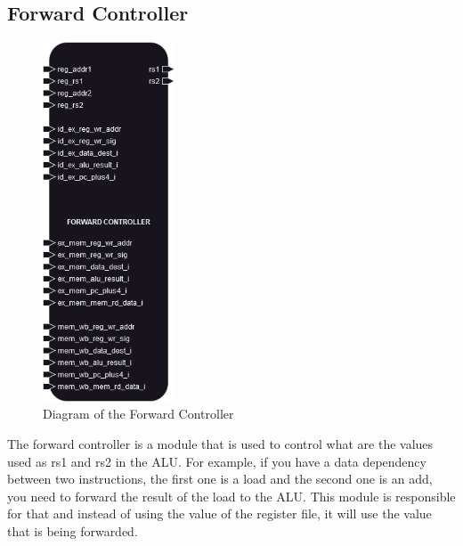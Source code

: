 \subsection{Forward Controller}

\begin{figure}[H]
\centering
\includegraphics[width=0.35\textwidth]{../diagrams/decode/forward_controller.png}
\caption{Diagram of the Forward Controller}
\label{fig:forward_controller}
\end{figure}

The forward controller is a module that is used to control what are the values used as rs1 and rs2 in the ALU. 
For example, if you have a data dependency between two instructions, the first one is a load and the second one is an add,
you need to forward the result of the load to the ALU. This module is responsible for that and instead of using the value of the register file,
it will use the value that is being forwarded. \\

